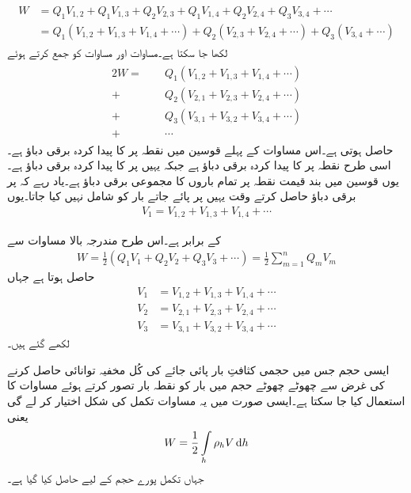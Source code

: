\begin{gather}
\begin{aligned}\label{مساوات_توانائی_بار_کثافت_توانائی_ب}
W&=Q_1 V_{1,2}+Q_1 V_{1,3} +Q_2 V_{2,3}+Q_1 V_{1,4} +Q_2 V_{2,4}+Q_3 V_{3,4}+\cdots\\
&=Q_1 (V_{1,2}+V_{1,3} + V_{1,4} +\cdots)+Q_2 (V_{2,3}+V_{2,4}+\cdots)+Q_3(V_{3,4}+\cdots)
\end{aligned}
\end{gather}
  لکھا جا سکتا ہے۔مساوات  اور مساوات  کو جمع کرتے ہوئے
\begin{gather}
\begin{aligned}
2 W=\phantom{+}&Q_1(V_{1,2}+V_{1,3} + V_{1,4} +\cdots)\\
+&Q_2 (V_{2,1}+V_{2,3}+V_{2,4}+\cdots)\\
+&Q_3( V_{3,1}+V_{3,2}+V_{3,4}+\cdots)\\
+&\cdots
\end{aligned}
\end{gather}
حاصل ہوتی ہے۔اس مساوات کے پہلے قوسین میں  نقطہ  پر  کا پیدا کردہ برقی دباؤ ہے۔اسی طرح  نقطہ  پر  کا پیدا کردہ برقی دباؤ ہے جبکہ  یہیں پر  کا پیدا کردہ برقی دباؤ ہے۔یوں قوسین میں بند قیمت نقطہ  پر تمام باروں کا مجموعی برقی دباؤ  ہے۔یاد رہے کہ  پر برقی دباؤ حاصل کرتے وقت یہیں پر پائے جاتے بار  کو شامل نہیں کیا جاتا۔یوں
\begin{align*}
V_1=V_{1,2}+V_{1,3} + V_{1,4} +\cdots
\end{align*}

کے برابر ہے۔اس طرح مندرجہ بالا مساوات سے
\begin{align}\label{مساوات_توانائی_بار_کثافت_توانائی_پ}
W=\frac{1}{2}\left(Q_1 V_1+Q_2 V_2+Q_3 V_3+\cdots\right)=\frac{1}{2}\sum_{m=1}^{n} Q_m V_m
\end{align}
حاصل ہوتا ہے جہاں 
\begin{align*}
V_1&=V_{1,2}+V_{1,3} + V_{1,4} +\cdots\\
V_2&=V_{2,1}+V_{2,3}+V_{2,4}+\cdots\\
V_3&=V_{3,1}+V_{3,2}+V_{3,4}+\cdots
\end{align*}
لکھے گئے ہیں۔

ایسی حجم جس میں حجمی کثافتِ بار  پائی جائے کی کُل مخفیہ توانائی حاصل کرنے کی غرض سے  چھوٹے چھوٹے حجم  میں بار  کو نقطہ بار تصور کرتے ہوئے مساوات  کا استعمال کیا جا سکتا ہے۔ایسی صورت میں یہ مساوات تکمل کی شکل اختیار کر لے گی یعنی
 \begin{align}\label{مساوات_توانائی_کثافت_توانائی}
W=\frac{1}{2}\int \limits_h \rho_h V \dif h
\end{align}
جہاں تکمل پورے حجم  کے لیے حاصل کیا گیا ہے۔

